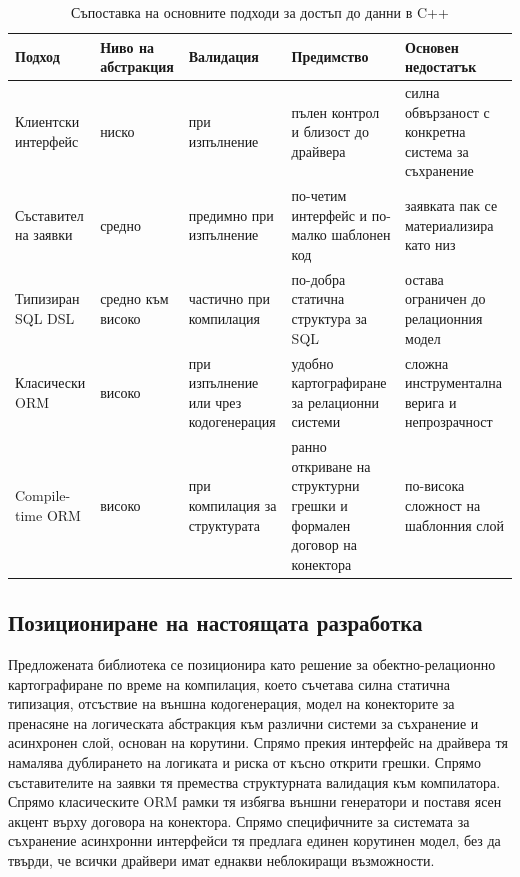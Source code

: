 \begin{table}[H]
\centering
\caption{Съпоставка на основните подходи за достъп до данни в C++}
\label{tab:existing_solutions_comparison}
\begin{tabularx}{\textwidth}{L{3.2cm}L{2.5cm}L{2.7cm}L{2.9cm}Y}
\toprule
\textbf{Подход} & \textbf{Ниво на абстракция} & \textbf{Валидация} & \textbf{Предимство} & \textbf{Основен недостатък} \\
\midrule
Клиентски интерфейс & ниско & при изпълнение & пълен контрол и близост до драйвера & силна обвързаност с конкретна система за съхранение \\
\hdashline
Съставител на заявки & средно & предимно при изпълнение & по-четим интерфейс и по-малко шаблонен код & заявката пак се материализира като низ \\
\hdashline
Типизиран SQL DSL & средно към високо & частично при компилация & по-добра статична структура за SQL & остава ограничен до релационния модел \\
\hdashline
Класически ORM & високо & при изпълнение или чрез кодогенерация & удобно картографиране за релационни системи & сложна инструментална верига и непрозрачност \\
\hdashline
Compile-time ORM & високо & при компилация за структурата & ранно откриване на структурни грешки и формален договор на конектора & по-висока сложност на шаблонния слой \\
\bottomrule
\end{tabularx}
\end{table}

\subsection{Позициониране на настоящата разработка}

Предложената библиотека се позиционира като решение за обектно-релационно картографиране по време на компилация, което съчетава силна статична типизация, отсъствие на външна кодогенерация, модел на конекторите за пренасяне на логическата абстракция към различни системи за съхранение и асинхронен слой, основан на корутини. Спрямо прекия интерфейс на драйвера тя намалява дублирането на логиката и риска от късно открити грешки. Спрямо съставителите на заявки тя премества структурната валидация към компилатора. Спрямо класическите ORM рамки тя избягва външни генератори и поставя ясен акцент върху договора на конектора. Спрямо специфичните за системата за съхранение асинхронни интерфейси тя предлага единен корутинен модел, без да твърди, че всички драйвери имат еднакви неблокиращи възможности.

